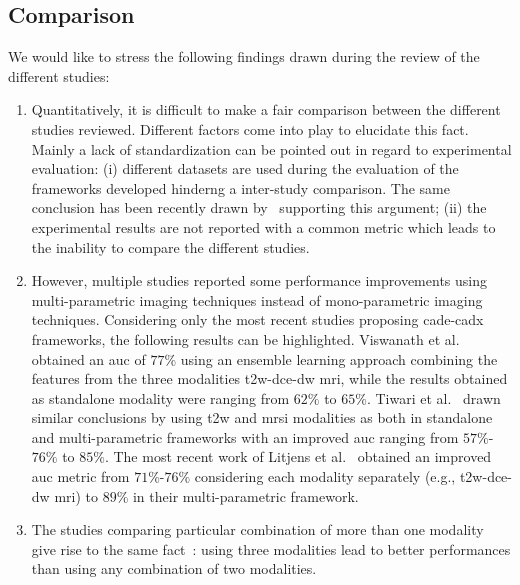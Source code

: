 


\subsection{Comparison}\label{subsec:chp3:dis:com}

We would like to stress the following findings drawn during the review of the different studies:

\begin{enumerate}
\item Quantitatively, it is difficult to make a fair comparison between the different studies reviewed.
Different factors come into play to elucidate this fact.
Mainly a lack of standardization can be pointed out in regard to experimental evaluation: (i) different datasets are used during the evaluation of the frameworks developed hinderng a inter-study comparison.
The same conclusion has been recently drawn by~\cite{Litjens2014} supporting this argument; (ii) the experimental results are not reported with a common metric which leads to the inability to compare the different studies.

\item \label{here} However, multiple studies reported some performance improvements using multi-parametric imaging techniques instead of mono-parametric imaging techniques.
Considering only the most recent studies proposing \ac{cade}-\ac{cadx} frameworks, the following results can be highlighted.
Viswanath et al.~\cite{Viswanath2011} obtained an \ac{auc} of $77\%$ using an ensemble learning approach combining the features from the three modalities \ac{t2w}-\ac{dce}-\ac{dw} \ac{mri}, while the results obtained as standalone modality were ranging from $62\%$ to $65\%$. 
Tiwari et al.~\cite{Tiwari2013} drawn similar conclusions by using \ac{t2w} and \ac{mrsi} modalities as both in standalone and multi-parametric frameworks with an improved \ac{auc} ranging from $57\%$-$76\%$ to $85\%$.
The most recent work of Litjens et al.~\cite{Litjens2014} obtained an improved \ac{auc} metric from $71\%$-$76\%$ considering each modality separately (e.g., \ac{t2w}-\ac{dce}-\ac{dw} \ac{mri}) to $89\%$ in their multi-parametric framework.

\item The studies comparing particular combination of more than one modality give rise to the same fact~\cite{Ozer2010,Litjens2011,Liu2013,Litjens2014}: using three modalities lead to better performances than using any combination of two modalities. 


\end{enumerate}
